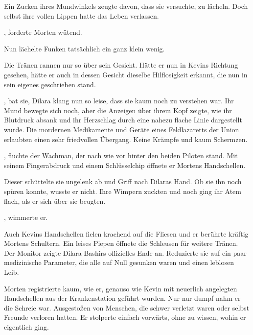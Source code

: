 Ein Zucken ihres Mundwinkels zeugte davon, dass sie versuchte, zu lächeln. Doch selbst ihre vollen Lippen hatte das Leben verlassen. 

\par

, forderte Morten wütend. 

\par

Nun lächelte Funken tatsächlich ein ganz klein wenig. 

\par

Die Tränen rannen nur so über sein Gesicht. Hätte er nun in Kevins Richtung gesehen, hätte er auch in dessen Gesicht dieselbe Hilflosigkeit erkannt, die nun in sein eigenes geschrieben stand.

\par

, bat sie,  Dilara klang nun so leise, dass sie kaum noch zu verstehen war. Ihr Mund bewegte sich noch, aber die Anzeigen über ihrem Kopf zeigte, wie ihr Blutdruck absank und ihr Herzschlag durch eine nahezu flache Linie dargestellt wurde. Die mordernen Medikamente und Geräte eines Feldlazaretts der Union erlaubten einen sehr friedvollen Übergang. Keine Krämpfe und kaum Schermzen.

\par

, fluchte der Wachman, der nach wie vor hinter den beiden Piloten stand. Mit seinem Fingerabdruck und einem Schlüsselchip öffnete er Mortens Handschellen.

\par

Dieser schüttelte sie ungelenk ab und Griff nach Dilaras Hand. Ob sie ihn noch spüren konnte, wusste er nicht. Ihre Wimpern zuckten und noch ging ihr Atem flach, als er sich über sie beugten.

\par

, wimmerte er. 

\par

Auch Kevins Handschellen fielen krachend auf die Fliesen und er berührte kräftig Mortens Schultern. Ein leises Piepen öffnete die Schleusen für weitere Tränen. Der Monitor zeigte Dilara Bashirs offizielles Ende an. Reduzierte sie auf ein paar medizinische Parameter, die alle auf Null gesunken waren und einen leblosen Leib.

\par

Morten registrierte kaum, wie er, genauso wie Kevin mit neuerlich angelegten Handschellen aus der Krankenstation geführt wurden. Nur nur dumpf nahm er die Schreie war. Ausgestoßen von Menschen, die schwer verletzt waren oder selbst Freunde verloren hatten. Er stolperte einfach vorwärts, ohne zu wissen, wohin er eigentlich ging.